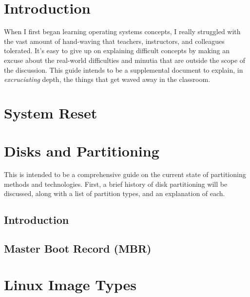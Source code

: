 \documentclass{article}
\begin{document}
\section{Introduction}
When I first began learning operating systems concepts, I really struggled with
the vast amount of hand-waving that teachers, instructors, and colleagues
tolerated. It's easy to give up on explaining difficult concepts by making an
excuse about the real-world difficulties and minutia that are outside the scope
of the discussion. This guide intends to be a supplemental document to explain,
in \textit{excruciating} depth, the things that get waved away in the
classroom.

\section{System Reset}

\section{Disks and Partitioning}
This is intended to be a comprehensive guide on the current state of
partitioning methods and technologies. First, a brief history of disk
partitioning will be discussed, along with a list of partition types, and an
explanation of each.

\subsection{Introduction}


\subsection{Master Boot Record (MBR)}

\section{Linux Image Types}
\end{document}
